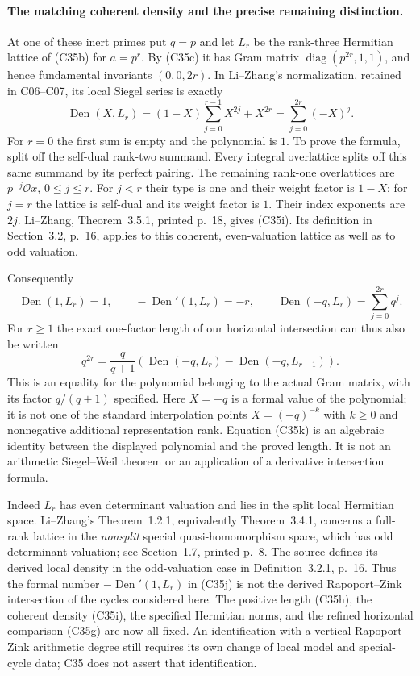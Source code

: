 \documentclass[11pt]{article}
\theoremstyle{definition}\newtheorem{definition}[theorem]{Definition}\newtheorem{remark}[theorem]{Remark}
\begin{document}
\paragraph{The matching coherent density and the precise remaining distinction.}
At one of these inert primes put $q=p$ and let $L_r$ be
the rank-three Hermitian lattice of (C35b) for $a=p^r$.
By (C35c) it has Gram matrix
$\operatorname{diag}(p^{2r},1,1)$, and hence
fundamental invariants $(0,0,2r)$. In Li--Zhang's
normalization, retained in C06--C07, its local Siegel
series is exactly
\[
 \operatorname{Den}(X,L_r)
   =(1-X)\sum_{j=0}^{r-1}X^{2j}+X^{2r}
   =\sum_{j=0}^{2r}(-X)^j.
 \tag{C35i}
\]
For $r=0$ the first sum is empty and the polynomial is $1$.
To prove the formula, split off the self-dual rank-two
summand. Every integral overlattice splits off this same
summand by its perfect pairing. The remaining rank-one
overlattices are $p^{-j}\mathcal O x$, $0\le j\le r$.
For $j<r$ their type is one and their weight factor is
$1-X$; for $j=r$ the lattice is self-dual and its weight
factor is $1$. Their index exponents are $2j$.
Li--Zhang, Theorem~3.5.1, printed p.~18, gives (C35i).
Its definition in Section~3.2, p.~16, applies to this
coherent, even-valuation lattice as well as to odd valuation.

Consequently
\[
 \operatorname{Den}(1,L_r)=1,\qquad
 -\operatorname{Den}'(1,L_r)=-r,\qquad
 \operatorname{Den}(-q,L_r)=\sum_{j=0}^{2r}q^j.
 \tag{C35j}
\]
For $r\ge1$ the exact one-factor length of our horizontal
intersection can thus also be written
\[
 q^{2r}=
 \frac{q}{q+1}
 \left(\operatorname{Den}(-q,L_r)
               -\operatorname{Den}(-q,L_{r-1})\right).
 \tag{C35k}
\]
This is an equality for the polynomial belonging to the
actual Gram matrix, with its factor $q/(q+1)$ specified.
Here $X=-q$ is a formal value of the polynomial; it is
not one of the standard interpolation points
$X=(-q)^{-k}$ with $k\geq0$ and nonnegative additional
representation rank. Equation (C35k) is an algebraic
identity between the displayed polynomial and the proved
length. It is not an arithmetic Siegel--Weil theorem or
an application of a derivative intersection formula.

Indeed $L_r$ has even determinant valuation and lies in
the split local Hermitian space. Li--Zhang's
Theorem~1.2.1, equivalently Theorem~3.4.1, concerns a
full-rank lattice in the \emph{nonsplit} special
quasi-homomorphism space, which has odd determinant
valuation; see Section~1.7, printed p.~8.
The source defines its derived local density in the
odd-valuation case in Definition~3.2.1, p.~16.
Thus the formal number $-\operatorname{Den}'(1,L_r)$
in (C35j) is not the derived Rapoport--Zink intersection
of the cycles considered here. The positive length
(C35h), the coherent density (C35i), the specified
Hermitian norms, and the refined horizontal comparison
(C35g) are now all fixed. An identification with a
vertical Rapoport--Zink arithmetic degree still requires
its own change of local model and special-cycle data;
C35 does not assert that identification.
\end{document}
